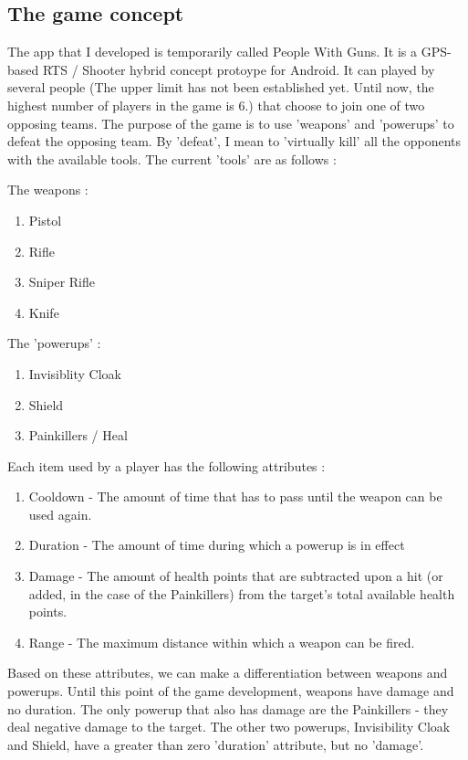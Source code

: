 \documentclass{article}
\begin{document}
\subsection{The game concept}
The app that I developed is temporarily called People With Guns. It is a GPS-
based RTS / Shooter hybrid concept protoype for Android. It can played by
several people (The upper limit has not been established yet. Until now, the
highest number of players in the game is 6.) that choose to join one of two
opposing teams. The purpose of the game is to use 'weapons' and 'powerups' to
defeat the opposing team. By 'defeat', I mean to 'virtually kill' all the
opponents with the available tools. The current 'tools' are as follows :\newline 

The weapons : 
\begin{enumerate}
  \item Pistol
  \item Rifle
  \item Sniper Rifle
  \item Knife   
\end{enumerate}

The 'powerups' :
\begin{enumerate}
  \item Invisiblity Cloak
  \item Shield
  \item Painkillers / Heal
\end{enumerate}

Each item used by a player has the following attributes : 
\begin{enumerate}
  \item Cooldown - The amount of time that has to pass until the weapon can be
  used again.
  \item Duration - The amount of time during which a powerup is in effect 
  \item Damage - The amount of health points that are subtracted upon a hit (or
  added, in the case of the Painkillers) from the target's total available
  health points.
  \item Range - The maximum distance within which a weapon can be fired.
\end{enumerate}

Based on these attributes, we can make a differentiation between weapons and
powerups. Until this point of the game development, weapons have damage and no
duration. The only powerup that also has damage are the Painkillers - they deal
negative damage to the target. The other two powerups, Invisibility Cloak and
Shield, have a greater than zero 'duration' attribute, but no 'damage'.\newline
\end{document}
